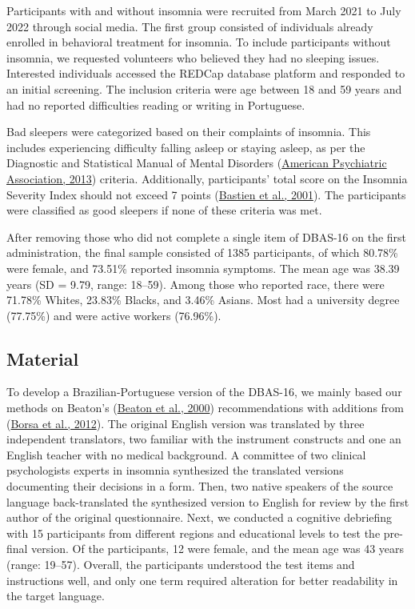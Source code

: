 \documentclass[
  ,doc,11pt, twoside,floatsintext]{apa6}
\begin{document}
Participants with and without insomnia were recruited from March 2021 to July 2022 through social media. The first group consisted of individuals already enrolled in behavioral treatment for insomnia. To include participants without insomnia, we requested volunteers who believed they had no sleeping issues. Interested individuals accessed the REDCap database platform and responded to an initial screening. The inclusion criteria were age between 18 and 59 years and had no reported difficulties reading or writing in Portuguese.

Bad sleepers were categorized based on their complaints of insomnia. This includes experiencing difficulty falling asleep or staying asleep, as per the Diagnostic and Statistical Manual of Mental Disorders (\protect\hyperlink{ref-americanpsychiatricassociation2013}{American Psychiatric Association, 2013}) criteria. Additionally, participants' total score on the Insomnia Severity Index should not exceed 7 points (\protect\hyperlink{ref-bastien2001}{Bastien et al., 2001}). The participants were classified as good sleepers if none of these criteria was met.

After removing those who did not complete a single item of DBAS-16 on the first administration, the final sample consisted of 1385 participants, of which 80.78\% were female, and 73.51\% reported insomnia symptoms. The mean age was 38.39 years (SD = 9.79, range: 18--59). Among those who reported race, there were 71.78\% Whites, 23.83\% Blacks, and 3.46\% Asians. Most had a university degree (77.75\%) and were active workers (76.96\%).

\hypertarget{material}{%
\subsection{Material}\label{material}}

To develop a Brazilian-Portuguese version of the DBAS-16, we mainly based our methods on Beaton's (\protect\hyperlink{ref-beaton2000}{Beaton et al., 2000}) recommendations with additions from (\protect\hyperlink{ref-borsaAdaptacaoValidacaoInstrumentos2012}{Borsa et al., 2012}). The original English version was translated by three independent translators, two familiar with the instrument constructs and one an English teacher with no medical background. A committee of two clinical psychologists experts in insomnia synthesized the translated versions documenting their decisions in a form. Then, two native speakers of the source language back-translated the synthesized version to English for review by the first author of the original questionnaire. Next, we conducted a cognitive debriefing with 15 participants from different regions and educational levels to test the pre-final version. Of the participants, 12 were female, and the mean age was 43 years (range: 19--57). Overall, the participants understood the test items and instructions well, and only one term required alteration for better readability in the target language.
\end{document}
